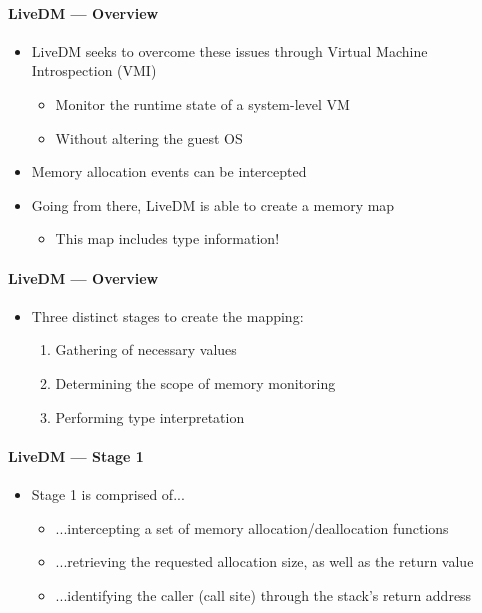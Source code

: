 \documentclass{i20lecture}
\begin{document}
\begin{frame}{\insertsection}
  \framesubtitle{LiveDM --- Overview}

  \begin{itemize}
	\item LiveDM seeks to overcome these issues through Virtual Machine Introspection (VMI)
	\pause
	\begin{itemize}
		\item Monitor the runtime state of a system-level VM
		\pause
		\item Without altering the guest OS
	\end{itemize}
\pause
    \item Memory allocation events can be intercepted
\pause
    \item Going from there, LiveDM is able to create a memory map
	\begin{itemize}
		\pause
		\item This map includes type information!
	\end{itemize}
  \end{itemize}
\end{frame}

\begin{frame}{\insertsection}
  \framesubtitle{LiveDM --- Overview}

  \begin{itemize}
    \item Three distinct stages to create the mapping:
    \begin{enumerate}
\pause
     \item Gathering of necessary values
\pause
     \item Determining the scope of memory monitoring
\pause
     \item Performing type interpretation
    \end{enumerate}
  \end{itemize}
\end{frame}

\begin{frame}{\insertsection}
  \framesubtitle{LiveDM --- Stage 1}

  \begin{itemize}
    \item Stage 1 is comprised of...
    \begin{itemize}
     \item ...intercepting a set of memory allocation/deallocation functions
\pause
     \item ...retrieving the requested allocation size, as well as the return value
\pause
	 \item ...identifying the caller (call site) through the stack's return address
    \end{itemize}
  \end{itemize}
\end{frame}
\end{document}
